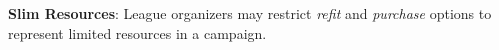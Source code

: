 \item {\bfseries Slim Resources}: League organizers may restrict \emph{refit} and \emph{purchase} options to represent limited resources in a campaign.
